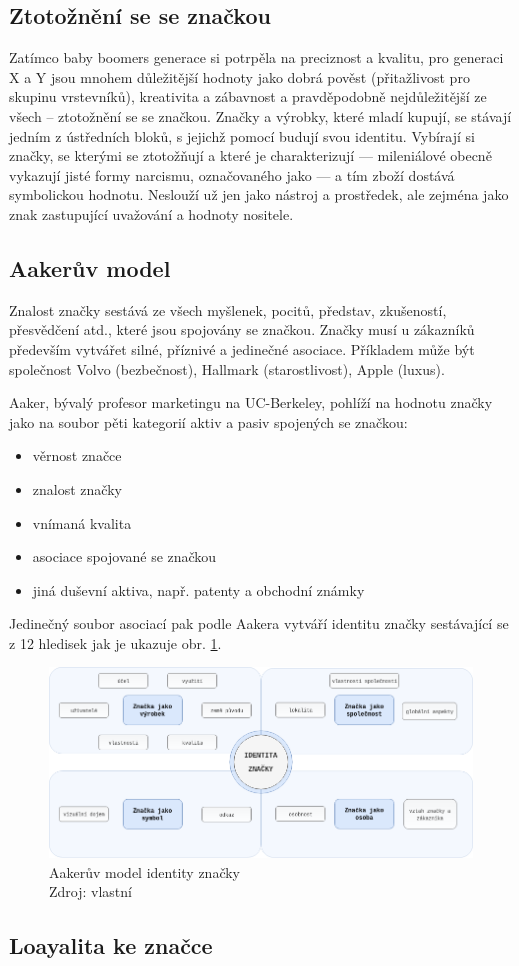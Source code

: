 \subsection{Ztotožnění se se značkou}

Zatímco baby boomers generace si potrpěla na preciznost a kvalitu, pro generaci X a Y jsou mnohem důležitější hodnoty jako dobrá pověst (přitažlivost pro skupinu vrstevníků), kreativita a zábavnost a pravděpodobně nejdůležitější ze všech -- ztotožnění se se značkou. Značky a výrobky, které mladí kupují, se stávají jedním z ústředních bloků, s jejichž pomocí budují svou identitu. Vybírají si značky, se kterými se ztotožňují a které je charakterizují --- mileniálové obecně vykazují jisté formy narcismu, označovaného jako  --- a tím zboží dostává symbolickou hodnotu. Neslouží už jen jako nástroj a prostředek, ale zejména jako znak zastupující uvažování a hodnoty nositele.\cite{bergh2012coolznacky}

\subsection{Aakerův model}
Znalost značky sestává ze všech myšlenek, pocitů, představ, zkušeností, přesvědčení atd., které jsou spojovány se značkou. Značky musí u zákazníků především vytvářet silné, příznivé a jedinečné asociace.\cite[s. 315]{kotler2007marketingmanagement}
Příkladem může být společnost Volvo (bezbečnost), Hallmark (starostlivost), Apple (luxus).

Aaker, bývalý profesor marketingu na UC-Berkeley, pohlíží na hodnotu značky jako na soubor pěti kategorií aktiv a pasiv spojených se značkou\cite{kotler2007marketingmanagement}:
\begin{itemize}
    \item věrnost značce
    \item znalost značky
    \item vnímaná kvalita
    \item asociace spojované se značkou
    \item jiná duševní aktiva, např. patenty a obchodní známky
\end{itemize}

Jedinečný soubor asociací pak podle Aakera vytváří identitu značky sestávající se z 12 hledisek jak je ukazuje obr. \ref{fig:aaker-brand-identity-model}.

\medskip
\begin{figure}[htbp!]
    \centering
    \includegraphics[width=.95\textwidth]{assets/aaker-model.png}
    \caption[Aakerův model identity značky]{Aakerův model identity značky \\ Zdroj: vlastní}
    \label{fig:aaker-brand-identity-model}
\end{figure}

\subsection{Loayalita ke značce}